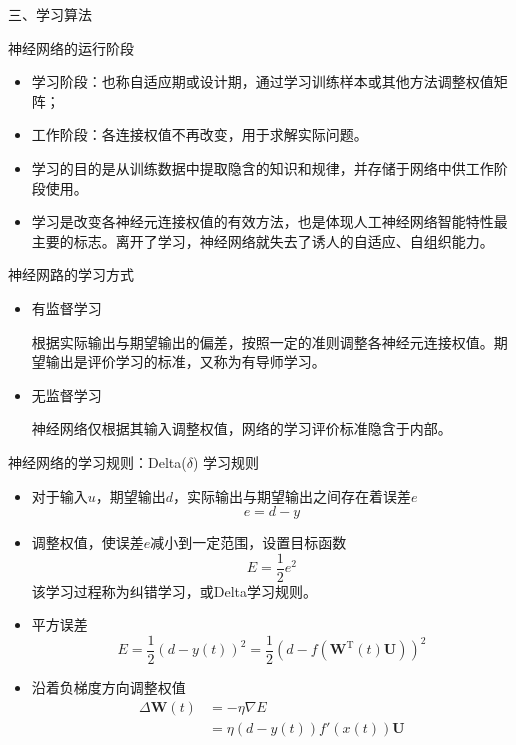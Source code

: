 \textcolor{main1}{三、学习算法}
\begin{note}
    神经网络的运行阶段
    \begin{itemize}
        \item 学习阶段：也称自适应期或设计期，通过学习训练样本或其他方法调整权值矩阵；
        \item 工作阶段：各连接权值不再改变，用于求解实际问题。
    \end{itemize}
\end{note}
\begin{itemize}
    \item 学习的目的是从训练数据中提取隐含的知识和规律，并存储于网络中供工作阶段使用。
    \item 学习是改变各神经元连接权值的有效方法，也是体现人工神经网络智能特性最主要的标志。离开了学习，神经网络就失去了诱人的自适应、自组织能力。
\end{itemize}
\begin{note}
    \textcolor{main1}{神经网路的学习方式}
    \begin{itemize}
        \item 有监督学习
        
        根据实际输出与期望输出的偏差，按照一定的准则调整各神经元连接权值。期望输出是评价学习的标准，又称为有导师学习。
        \item 无监督学习
        
        神经网络仅根据其输入调整权值，网络的学习评价标准隐含于内部。
    \end{itemize}
\end{note}
\begin{note}
    神经网络的学习规则：Delta($\delta$) 学习规则
    \begin{itemize}
        \item 对于输入$u$，期望输出$d$，实际输出与期望输出之间存在着误差$e$
        \[
            e = d - y
        \]
        \item 调整权值，使误差$e$减小到一定范围，设置目标函数
        \[
            E = \frac{1}{2}e^2
        \]
        该学习过程称为纠错学习，或Delta学习规则。
        \item 平方误差
        \[
            E = \frac{1}{2}\left( d-y(t) \right)^2 = \frac{1}{2}\left( d-f\left( \boldsymbol{W}^{\mathrm{T}}(t)\boldsymbol{U} \right) \right)^2
        \]
        \item 沿着\textcolor{main1}{负梯度方向}调整权值
        \[
            \begin{array}{ll}
                \Delta \boldsymbol{W}(t) &= -\eta \nabla E\\
                &=\eta \left( d-y(t) \right)f'\left( x(t) \right)\boldsymbol{U}
            \end{array}
        \]
    \end{itemize}
\end{note}
